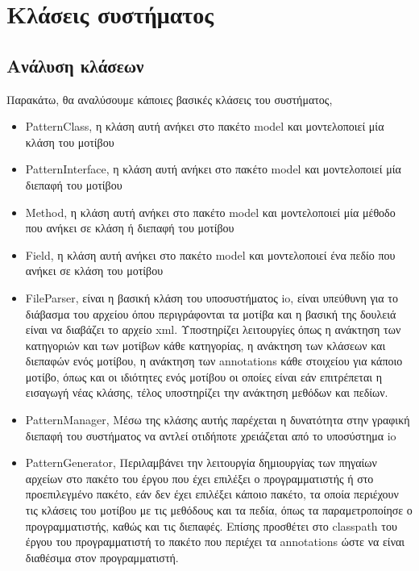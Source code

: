 \section{Κλάσεις συστήματος}
\label{sec:classes}
\subsection{Ανάλυση κλάσεων}
\label{subsec:classAnalysis}
Παρακάτω, θα αναλύσουμε κάποιες βασικές κλάσεις του συστήματος,
\begin{itemize}
    \item PatternClass, η κλάση αυτή ανήκει στο πακέτο model και μοντελοποιεί μία κλάση του μοτίβου
    \item PatternInterface, η κλάση αυτή ανήκει στο πακέτο model και μοντελοποιεί μία διεπαφή του μοτίβου
    \item Method, η κλάση αυτή ανήκει στο πακέτο model και μοντελοποιεί μία μέθοδο που ανήκει σε κλάση ή διεπαφή του μοτίβου
    \item Field, η κλάση αυτή ανήκει στο πακέτο model και μοντελοποιεί ένα πεδίο που ανήκει σε κλάση του μοτίβου
    \item FileParser, είναι η βασική κλάση του υποσυστήματος io, είναι υπεύθυνη για το διάβασμα του αρχείου όπου περιγράφονται
    τα μοτίβα και η βασική της δουλειά είναι να διαβάζει το αρχείο xml. Υποστηρίζει λειτουργίες όπως η ανάκτηση 
    των κατηγοριών και των μοτίβων κάθε κατηγορίας, η ανάκτηση των κλάσεων και διεπαφών ενός μοτίβου, 
    η ανάκτηση των annotations κάθε στοιχείου για κάποιο μοτίβο, όπως και οι ιδιότητες ενός μοτίβου 
    οι οποίες είναι εάν επιτρέπεται η εισαγωγή νέας κλάσης, τέλος υποστηρίζει την ανάκτηση μεθόδων και πεδίων.
    \item PatternManager, Μέσω της κλάσης αυτής παρέχεται η δυνατότητα στην γραφική διεπαφή του συστήματος 
    να αντλεί οτιδήποτε χρειάζεται από το υποσύστημα io
    \item PatternGenerator, Περιλαμβάνει την λειτουργία δημιουργίας των πηγαίων αρχείων στο πακέτο του έργου που έχει επιλέξει 
    ο προγραμματιστής ή στο προεπιλεγμένο πακέτο, εάν δεν έχει επιλέξει κάποιο πακέτο, τα οποία περιέχουν 
    τις κλάσεις του μοτίβου με τις μεθόδους και τα πεδία, όπως τα παραμετροποίησε ο προγραμματιστής, καθώς και τις διεπαφές. 
    Επίσης προσθέτει στο classpath του έργου του προγραμματιστή το πακέτο που περιέχει τα annotations 
    ώστε να είναι διαθέσιμα στον προγραμματιστή.
     
\end{itemize}
